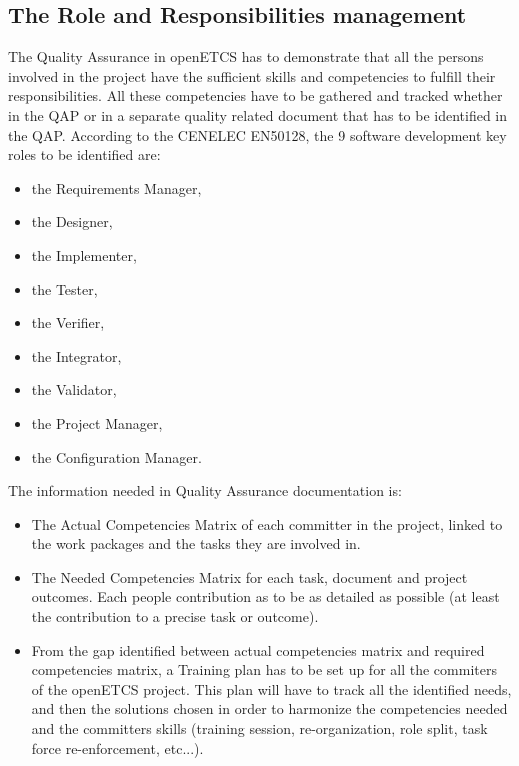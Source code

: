 \documentclass{template/openetcs_article}
\begin{document}
\subsection{The Role and Responsibilities management}
The Quality Assurance in openETCS has to demonstrate that all the persons involved in the project have the sufficient skills and competencies to fulfill their
responsibilities. All these competencies have to be gathered and tracked whether in the QAP or in a separate quality related document that has to be identified
in the QAP.
According to the CENELEC EN50128, the 9 software development key roles to be identified are:
\begin{itemize}
\item the Requirements Manager,
\item the Designer,
\item the Implementer,
\item the Tester,
\item the Verifier,
\item the Integrator,
\item the Validator,
\item the Project Manager,
\item the Configuration Manager.
\end{itemize}

The information needed in Quality Assurance documentation is:
\begin{itemize}
\item The Actual Competencies Matrix of each committer in the project, linked to the work packages and the tasks they are involved in.
\item The Needed Competencies Matrix for each task, document and project outcomes. Each people contribution as to be as detailed as possible (at least the
contribution to a precise task or outcome).
\item From the gap identified between actual competencies matrix and required competencies matrix, a Training plan has to be set up for all the commiters of the
openETCS project. This plan will have to track all the identified needs, and then the solutions chosen in order to harmonize the competencies needed and the
committers skills (training session, re-organization, role split, task force re-enforcement, etc...).
\end{itemize}
\end{document}
